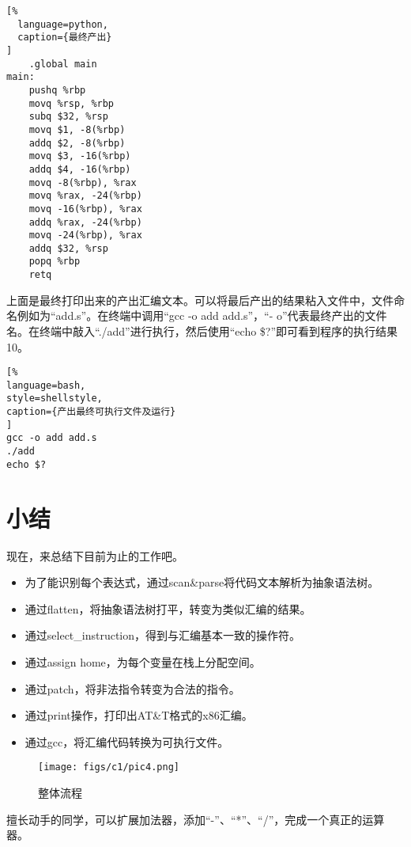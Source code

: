 \begin{lstlisting}[%
  language=python,
  caption={最终产出}
]
    .global main
main:
    pushq %rbp
    movq %rsp, %rbp
    subq $32, %rsp
    movq $1, -8(%rbp)
    addq $2, -8(%rbp)
    movq $3, -16(%rbp)
    addq $4, -16(%rbp)
    movq -8(%rbp), %rax
    movq %rax, -24(%rbp)
    movq -16(%rbp), %rax
    addq %rax, -24(%rbp)
    movq -24(%rbp), %rax
    addq $32, %rsp
    popq %rbp
    retq
\end{lstlisting}

上面是最终打印出来的产出汇编文本。可以将最后产出的结果粘入文件中，文件命名例如为“add.s”。在终端中调用“gcc -o add add.s”，“- o”代表最终产出的文件名。在终端中敲入“./add”进行执行，然后使用“echo \$?”即可看到程序的执行结果10。

\begin{lstlisting}[%
language=bash,
style=shellstyle,
caption={产出最终可执行文件及运行}
]
gcc -o add add.s
./add
echo $?
\end{lstlisting}

\section{小结}

现在，来总结下目前为止的工作吧。

\begin{itemize}
  \item 为了能识别每个表达式，通过scan\&parse将代码文本解析为抽象语法树。
  \item 通过flatten，将抽象语法树打平，转变为类似汇编的结果。
  \item 通过select\_instruction，得到与汇编基本一致的操作符。
  \item 通过assign home，为每个变量在栈上分配空间。
  \item 通过patch，将非法指令转变为合法的指令。
  \item 通过print操作，打印出AT\&T格式的x86汇编。
  \item 通过gcc，将汇编代码转换为可执行文件。
\end{itemize}

\begin{figure}[ht]
\centering
\texttt{[image: figs/c1/pic4.png]}
\caption{整体流程}
\label{fig:fig4}
\end{figure}

擅长动手的同学，可以扩展加法器，添加“-”、“*”、“/”，完成一个真正的运算器。
